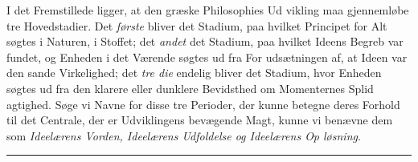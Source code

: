 \documentclass[12pt,a4paper]{book}
\newcommand{\divrule}{\begin{center}\rule{2cm}{0.4pt}\end{center}}
\begin{document}
I det Fremstillede ligger, at den græske Philosophies Ud\-%
vikling maa gjennemløbe tre Hovedstadier. Det \emph{første} bliver
det Stadium, paa hvilket Principet for Alt søgtes i Naturen, i
Stoffet; det \emph{andet} det Stadium, paa hvilket Ideens Begreb
var fundet, og Enheden i det Værende søgtes ud fra For\-%
udsætningen af, at Ideen var den sande Virkelighed; det \emph{tre\-%
die} endelig bliver det Stadium, hvor Enheden søgtes ud fra
den klarere eller dunklere Bevidsthed om Momenternes Splid\-%
agtighed. Søge vi Navne for disse tre Perioder, der kunne
%
betegne deres Forhold til det Centrale, der er Udviklingens
bevægende Magt, kunne vi benævne dem som \emph{Ideelærens
Vorden, Ideelærens Udfoldelse og Ideelærens Op\-%
løsning}.
\divrule
\end{document}
